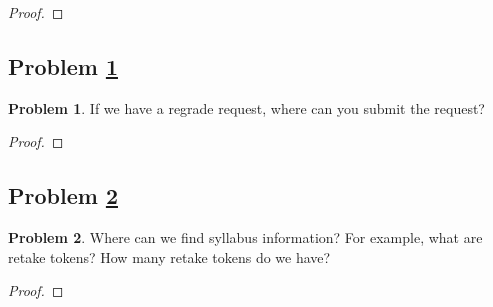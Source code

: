 \documentclass[11pt]{article}
\theoremstyle{definition}
\theoremstyle{definition}
\newtheorem{required}{Problem}
\theoremstyle{definition}
\begin{document}
\begin{proof}
\end{proof}



\newpage
\subsection{Problem \ref{Latex3}}
\begin{required} \label{Latex3}
    If we have a regrade request, where can you submit the request?
\end{required}

\begin{proof}
\end{proof}



\newpage
\subsection{Problem \ref{Latex4}}
\begin{required} \label{Latex4}
    Where can we find syllabus information? For example, what are retake tokens? How many retake tokens do we have?
\end{required}
\begin{proof}
\end{proof}



\end{document}
